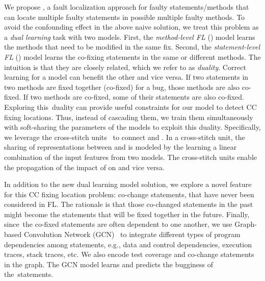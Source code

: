 We propose {\tool}, a fault localization approach for faulty
statements/methods that can locate multiple faulty statements in
possible multiple faulty methods. To avoid the confounding effect in
the above naive solution, we treat this problem as a {\em
  dual learning} task with two models. First, the {\em method-level
  FL} () model learns the methods that need to be
modified in the same fix. Second, the {\em statement-level FL}
() model learns the co-fixing statements in the same or
different methods. The intuition is that they are closely related,
which we refer to as {\em duality}. Correct learning for a model can
benefit the other and vice versa. If two statements in two methods are
fixed together (co-fixed) for a bug, those methods are also
co-fixed. If two methods are co-fixed, some of their statements are
also co-fixed. Exploring this~duality can provide useful constraints
for our model to detect CC fixing locations. Thus, instead of
cascading them, we train them simultaneously with soft-sharing the
parameters of the models to exploit this duality. Specifically, we
leverage the cross-stitch units~\cite{misra2016cross} to connect
 and .
%
In a cross-stitch unit, the sharing of representations between
 and  is modeled by the learning a linear
combination of the input features from two models. The cross-stitch
units enable the propagation of the impact of  on
 and vice versa.


In addition to the new dual learning model solution, we explore a
novel feature for this CC fixing location problem: co-change
statements, that have never been considered in FL.
The rationale
is that those co-changed statements in the past might become the
statements that will be fixed together in the future. Finally,
since~the co-fixed statements are often dependent to one another, we
use Graph-based Convolution Network (GCN)~\cite{li2019gcn} to
integrate different types of program dependencies among statements,
e.g., data and control dependencies, execution traces, stack traces,
etc.
We also encode test coverage and co-change statements in the
graph. The GCN model learns and predicts the bugginess of
the~statements.

